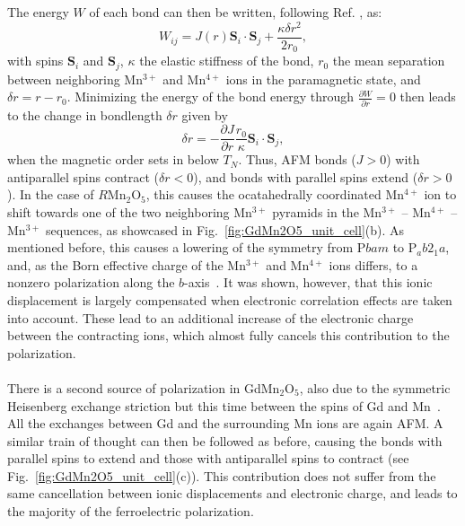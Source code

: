 The energy $W$ of each bond can then be written, following Ref. \cite{Harris1972}, as:
\begin{equation}
	W_{ij} = J(r)\bm{S}_i \cdot \bm{S}_j + \frac{\kappa \delta r^2}{2r_0},
\end{equation}
with spins $\bm{S}_i$ and $\bm{S}_j$, $\kappa$ the elastic stiffness of the bond, $r_0$ the mean separation between neighboring Mn$^{3+}$ and Mn$^{4+}$ ions in the paramagnetic state, and $\delta r = r - r_0$.
Minimizing the energy of the bond energy through $\frac{\partial W}{\partial r} = 0$ then leads to the change in bondlength $\delta r$ given by 
\begin{equation}
	\delta r = -\frac{\partial J}{\partial r}\frac{r_0}{\kappa}\bm{S}_i \cdot \bm{S}_j,
\end{equation}
when the magnetic order sets in below $T_N$. Thus, AFM bonds ($J > 0$) with antiparallel spins contract ($\delta r < 0$), and bonds with parallel spins extend ($\delta r > 0$).
In the case of $R$Mn$_2$O$_5$, this causes the ocatahedrally coordinated Mn$^{4+}$ ion to shift towards one of the two neighboring Mn$^{3+}$ pyramids in the Mn$^{3+}$ -- Mn$^{4+}$ -- Mn$^{3+}$ sequences, as showcased in Fig.~\ref{fig:GdMn2O5_unit_cell}(b).
As mentioned before, this causes a lowering of the symmetry from P$bam$ to P$_ab2_1a$, and, as the Born effective charge of the Mn$^{3+}$ and Mn$^{4+}$ ions differs, to a nonzero polarization along the $b$-axis~\cite{Khomskii2009}.
It was shown, however, that this ionic displacement is largely compensated when electronic correlation effects are taken into account.
These lead to an additional increase of the electronic charge between the contracting ions, which almost fully cancels this contribution to the polarization.
\\\\
There is a second source of polarization in GdMn$_2$O$_5$, also due to the symmetric Heisenberg exchange striction but this time between the spins of Gd and Mn~\cite{Lee13}.
All the exchanges between Gd and the surrounding Mn ions are again AFM.
A similar train of thought can then be followed as before, causing the bonds with parallel spins to extend and those with antiparallel spins to contract (see Fig.~\ref{fig:GdMn2O5_unit_cell}(c)).
This contribution does not suffer from the same cancellation between ionic displacements and electronic charge, and leads to the majority of the ferroelectric polarization.

